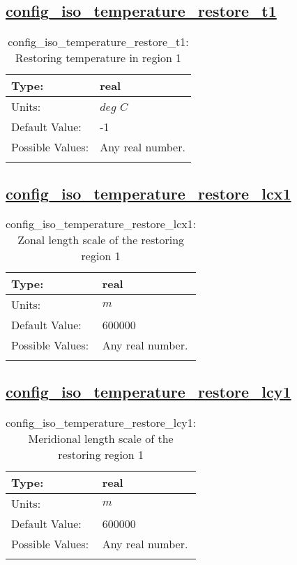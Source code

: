 \subsection[config\_iso\_temperature\_restore\_t1]{\hyperref[sec:nm_tab_iso]{config\_iso\_temperature\_restore\_t1}}
\label{subsec:nm_sec_config_iso_temperature_restore_t1}
\begin{center}
\begin{longtable}{| p{2.0in} || p{4.0in} |}
    \hline
    Type: & real \\
    \hline
    Units: & $deg$ $C$ \\
    \hline
    Default Value: & -1 \\
    \hline
    Possible Values: & Any real number. \\
    \hline
    \caption{config\_iso\_temperature\_restore\_t1: Restoring temperature in region 1}
\end{longtable}
\end{center}
\subsection[config\_iso\_temperature\_restore\_lcx1]{\hyperref[sec:nm_tab_iso]{config\_iso\_temperature\_restore\_lcx1}}
\label{subsec:nm_sec_config_iso_temperature_restore_lcx1}
\begin{center}
\begin{longtable}{| p{2.0in} || p{4.0in} |}
    \hline
    Type: & real \\
    \hline
    Units: & $m$ \\
    \hline
    Default Value: & 600000 \\
    \hline
    Possible Values: & Any real number. \\
    \hline
    \caption{config\_iso\_temperature\_restore\_lcx1: Zonal length scale of the restoring region 1}
\end{longtable}
\end{center}
\subsection[config\_iso\_temperature\_restore\_lcy1]{\hyperref[sec:nm_tab_iso]{config\_iso\_temperature\_restore\_lcy1}}
\label{subsec:nm_sec_config_iso_temperature_restore_lcy1}
\begin{center}
\begin{longtable}{| p{2.0in} || p{4.0in} |}
    \hline
    Type: & real \\
    \hline
    Units: & $m$ \\
    \hline
    Default Value: & 600000 \\
    \hline
    Possible Values: & Any real number. \\
    \hline
    \caption{config\_iso\_temperature\_restore\_lcy1: Meridional length scale of the restoring region 1}
\end{longtable}
\end{center}
